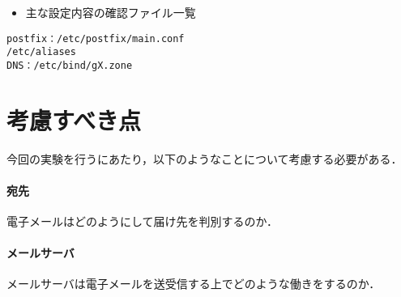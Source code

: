 \begin{itemize}
\item 主な設定内容の確認ファイル一覧
\end{itemize}

\begin{center}
\begin{breakbox}
\begin{alltt}
postfix   ：  /etc/postfix/main.conf
              /etc/aliases
DNS       ：  /etc/bind/gX.zone
\end{alltt}
\end{breakbox}
\end{center}

\section{考慮すべき点}
今回の実験を行うにあたり，以下のようなことについて考慮する必要がある．
\paragraph{宛先} 電子メールはどのようにして届け先を判別するのか．
\paragraph{メールサーバ} メールサーバは電子メールを送受信する上でどのような働きをするのか．

